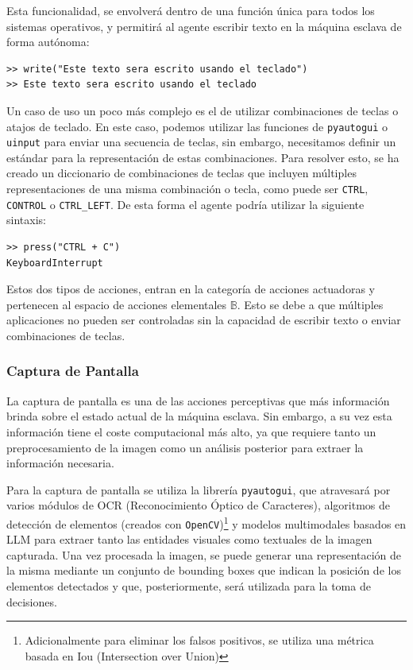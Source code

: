 Esta funcionalidad, se envolverá dentro de una función única para todos los sistemas operativos, 
y permitirá al agente escribir texto en la máquina esclava de forma autónoma:

\begin{lstlisting}[caption={Control del teclado}, label={cod:write_example}]
>> write("Este texto sera escrito usando el teclado")
>> Este texto sera escrito usando el teclado
\end{lstlisting}

Un caso de uso un poco más complejo es el de utilizar combinaciones de teclas
o atajos de teclado. En este caso, podemos utilizar las funciones de \texttt{pyautogui}
o \texttt{uinput} para enviar una secuencia de teclas, sin embargo, necesitamos definir
un estándar para la representación de estas combinaciones. Para resolver esto, se
ha creado un diccionario de combinaciones de teclas que incluyen múltiples representaciones
de una misma combinación o tecla, como puede ser \texttt{CTRL}, \texttt{CONTROL} o \texttt{CTRL\_LEFT}.
De esta forma el agente podría utilizar la siguiente sintaxis:

\begin{lstlisting}[caption={Control del teclado con combinaciones de teclas}, label={cod:write_combination_example}]
>> press("CTRL + C")
KeyboardInterrupt
\end{lstlisting}

Estos dos tipos de acciones, entran en la categoría de acciones actuadoras y pertenecen al 
espacio de acciones elementales \(\mathbb{B}\). Esto se debe a que múltiples aplicaciones 
no pueden ser controladas sin la capacidad de escribir texto o enviar combinaciones de teclas.

\subsubsection{Captura de Pantalla}
La captura de pantalla es una de las acciones perceptivas que más información
brinda sobre el estado actual de la máquina esclava. Sin embargo, a su vez esta
información tiene el coste computacional más alto, ya que requiere tanto un 
preprocesamiento de la imagen como un análisis posterior para extraer la información
necesaria.

Para la captura de pantalla se utiliza la librería \texttt{pyautogui}, que 
atravesará por varios módulos de OCR (Reconocimiento Óptico de Caracteres),
algoritmos de detección de elementos (creados con \texttt{OpenCV})\footnote{Adicionalmente para eliminar los falsos positivos, se utiliza una métrica basada en Iou (Intersection over Union)}
y modelos multimodales basados en LLM para extraer tanto las entidades visuales como
textuales de la imagen capturada. Una vez procesada la imagen, se puede 
generar una representación de la misma mediante un conjunto de bounding
boxes que indican la posición de los elementos detectados y que, posteriormente,
será utilizada para la toma de decisiones.

